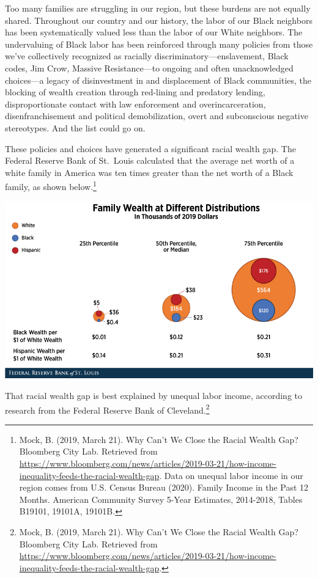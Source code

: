 \documentclass[
]{article}
\begin{document}
Too many families are struggling in our region, but these burdens are
not equally shared. Throughout our country and our history, the labor of
our Black neighbors has been systematically valued less than the labor
of our White neighbors. The undervaluing of Black labor has been
reinforced through many policies from those we've collectively
recognized as racially discriminatory---enslavement, Black codes, Jim
Crow, Massive Resistance---to ongoing and often unacknowledged
choices---a legacy of disinvestment in and displacement of Black
communities, the blocking of wealth creation through red-lining and
predatory lending, disproportionate contact with law enforcement and
overincarceration, disenfranchisement and political demobilization,
overt and subconscious negative stereotypes. And the list could go on.

These policies and choices have generated a significant racial wealth
gap. The Federal Reserve Bank of St.~Louis calculated that the average
net worth of a white family in America was ten times greater than the
net worth of a Black family, as shown below.\footnote{Mock, B. (2019,
  March 21). Why Can't We Close the Racial Wealth Gap? Bloomberg City
  Lab. Retrieved from
  \url{https://www.bloomberg.com/news/articles/2019-03-21/how-income-inequality-feeds-the-racial-wealth-gap}.
  Data on unequal labor income in our region comes from U.S. Census
  Bureau (2020). Family Income in the Past 12 Months. American Community
  Survey 5-Year Estimates, 2014-2018, Tables B19101, 19101A, 19101B.}

\begin{center}\includegraphics[width=0.8\linewidth]{images/WealthGap} \end{center}

That racial wealth gap is best explained by unequal labor income,
according to research from the Federal Reserve Bank of
Cleveland.\footnote{Mock, B. (2019, March 21). Why Can't We Close the
  Racial Wealth Gap? Bloomberg City Lab. Retrieved from
  \url{https://www.bloomberg.com/news/articles/2019-03-21/how-income-inequality-feeds-the-racial-wealth-gap}.}
\end{document}
